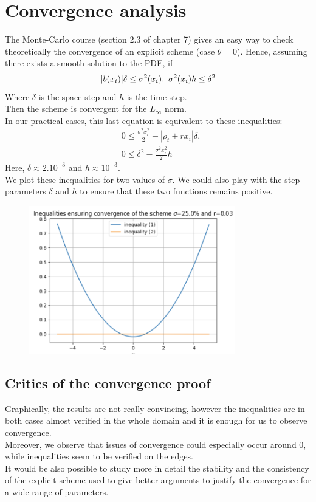 \documentclass{article}
\begin{document}
\section{Convergence analysis}
The Monte-Carlo course (section 2.3 of chapter 7) gives an easy way to check theoretically the convergence of an explicit scheme (case $\theta=0$). Hence, assuming there exists a smooth solution to the PDE, if
\begin{equation}
    |b(x_i)|\delta\leq \sigma^{2}(x_i), \\\
    \sigma^{2}(x_i)h\leq \delta^{2}
\end{equation}
Where $\delta$ is the space step and $h$ is the time step.\\
Then the scheme is convergent for the $L_\infty $ norm.\\
In our practical cases, this last equation is equivalent to these inequalities:
\begin{equation}
    \begin{aligned}
        &0\leq \frac{\sigma^{2}x_i^{2}}{2}-|\rho_t+rx_i|\delta, \\
        &0\leq \delta^{2}- \frac{\sigma^{2}x_i^{2}}{2}h
    \end{aligned}
\end{equation}
Here, $\delta \approx 2.10^{-3}$ and $h \approx 10^{-3}$.\\
We plot these inequalities for two values of $\sigma$.  We could also play with the step parameters $\delta$ and $h$ to ensure that these two functions remains positive.
\begin{figure}[h]
  \centering
  \includegraphics[width=0.8\textwidth]{charts/Ineq.png}
\end{figure}
\subsection{Critics of the convergence proof }
Graphically, the results are not really convincing, however the inequalities are in both cases almost verified in the whole domain and it is enough for us to observe convergence.\\
Moreover, we observe that issues of convergence could especially occur around 0, while inequalities seem to be verified on the edges.\\ 
It would be also possible to study more in detail the stability and the consistency of the explicit scheme used to give better arguments to justify the convergence for a wide range of  parameters.\\
\end{document}
